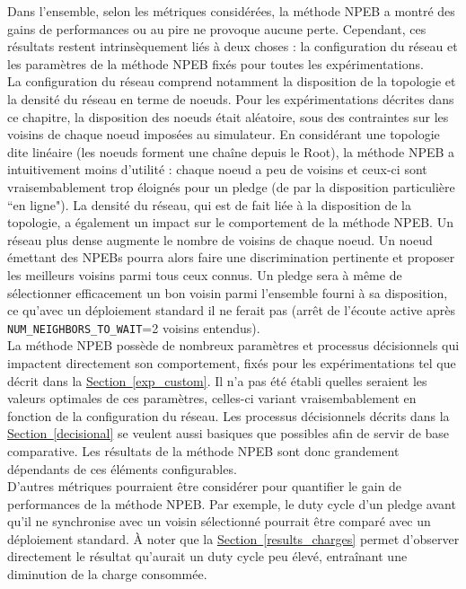 \documentclass[]{report}
\newcommand{\wordlink}[2]{\hyperref[#2]{#1~\ref{#2}}}
\begin{document}
Dans l'ensemble, selon les métriques considérées, la méthode NPEB a montré des gains de performances ou au pire ne provoque aucune perte. Cependant, ces résultats restent intrinsèquement liés à deux choses : la configuration du réseau et les paramètres de la méthode NPEB fixés pour toutes les expérimentations.\\

La configuration du réseau comprend notamment la disposition de la topologie et la densité du réseau en terme de noeuds. Pour les expérimentations décrites dans ce chapitre, la disposition des noeuds était aléatoire, sous des contraintes sur les voisins de chaque noeud imposées au simulateur. En considérant une topologie dite linéaire (les noeuds forment une chaîne depuis le Root), la méthode NPEB a intuitivement moins d'utilité : chaque noeud a peu de voisins et ceux-ci sont vraisembablement trop éloignés pour un pledge (de par la disposition particulière ``en ligne"). La densité du réseau, qui est de fait liée à la disposition de la topologie, a également un impact sur le comportement de la méthode NPEB. Un réseau plus dense augmente le nombre de voisins de chaque noeud. Un noeud émettant des NPEBs pourra alors faire une discrimination pertinente et proposer les meilleurs voisins parmi tous ceux connus. Un pledge sera à même de sélectionner efficacement un bon voisin parmi l'ensemble fourni à sa disposition, ce qu'avec un déploiement standard il ne ferait pas (arrêt de l'écoute active après \texttt{NUM\_NEIGHBORS\_TO\_WAIT}=2 voisins entendus).\\

La méthode NPEB possède de nombreux paramètres et processus décisionnels qui impactent directement son comportement, fixés pour les expérimentations tel que décrit dans la \wordlink{Section}{exp_custom}. Il n'a pas été établi quelles seraient les valeurs optimales de ces paramètres, celles-ci variant vraisembablement en fonction de la configuration du réseau. Les processus décisionnels décrits dans la \wordlink{Section}{decisional} se veulent aussi basiques que possibles afin de servir de base comparative. Les résultats de la méthode NPEB sont donc grandement dépendants de ces éléments configurables.\\

D'autres métriques pourraient être considérer pour quantifier le gain de performances de la méthode NPEB. Par exemple, le duty cycle d'un pledge avant qu'il ne synchronise avec un voisin sélectionné pourrait être comparé avec un déploiement standard. À noter que la \wordlink{Section}{results_charges} permet d'observer directement le résultat qu'aurait un duty cycle peu élevé, entraînant une diminution de la charge consommée.\\
\end{document}
